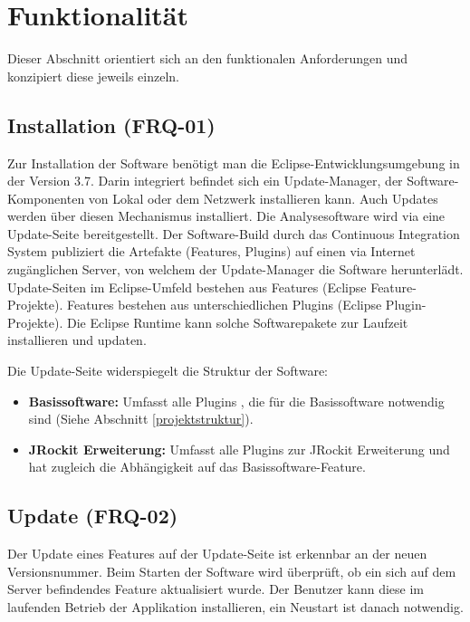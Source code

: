 \chapter{Funktionalität}\label{konzept_2}
Dieser Abschnitt orientiert sich an den funktionalen Anforderungen und konzipiert diese jeweils einzeln. 

\section{Installation (FRQ-01)}\label{installation}
Zur Installation der Software benötigt man die Eclipse-Entwicklungsumgebung in der Version 3.7. Darin integriert befindet sich ein Update-Manager, der Software-Komponenten von Lokal oder dem Netzwerk installieren kann. Auch Updates werden über diesen Mechanismus installiert. Die Analysesoftware wird via eine Update-Seite bereitgestellt. Der Software-Build durch das Continuous Integration System publiziert die Artefakte (Features, Plugins) auf einen via Internet zugänglichen Server, von welchem der Update-Manager die Software herunterlädt. Update-Seiten im Eclipse-Umfeld bestehen aus Features (Eclipse Feature-Projekte). Features bestehen aus unterschiedlichen Plugins (Eclipse Plugin-Projekte). Die Eclipse Runtime kann solche Softwarepakete zur Laufzeit installieren und updaten.

Die Update-Seite widerspiegelt die Struktur der Software:
\begin{itemize}
\item \textbf{Basissoftware:} Umfasst alle Plugins , die für die Basissoftware notwendig sind (Siehe Abschnitt \ref{projektstruktur}).
\item \textbf{JRockit Erweiterung: }Umfasst alle Plugins zur JRockit Erweiterung und hat zugleich die Abhängigkeit auf das Basissoftware-Feature.
\end{itemize}

\section{Update (FRQ-02)}
Der Update eines Features auf der Update-Seite ist erkennbar an der neuen Versionsnummer. Beim Starten der Software wird überprüft, ob ein sich auf dem Server befindendes Feature aktualisiert wurde. Der Benutzer kann diese im laufenden Betrieb der Applikation installieren, ein Neustart ist danach notwendig.

